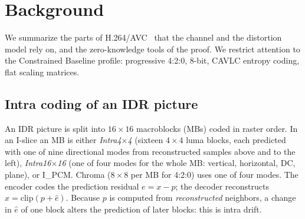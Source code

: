 \section{Background}
\label{sec:background}

We summarize the parts of H.264/AVC~\cite{itu_h264,wiegand2003overview,richardson2010h264} that the channel and the distortion model rely on, and the zero-knowledge tools of the proof. We restrict attention to the Constrained Baseline profile: progressive 4:2:0, 8-bit, CAVLC entropy coding, flat scaling matrices.

\subsection{Intra coding of an IDR picture}
An IDR picture is split into $16\times16$ macroblocks (MBs) coded in raster order. In an I-slice an MB is either \emph{Intra4$\times$4} (sixteen $4\times4$ luma blocks, each predicted with one of nine directional modes from reconstructed samples above and to the left), \emph{Intra16$\times$16} (one of four modes for the whole MB: vertical, horizontal, DC, plane), or I\_PCM. Chroma ($8\times8$ per MB for 4:2:0) uses one of four modes. The encoder codes the prediction residual $e=x-p$; the decoder reconstructs $\hat x=\mathrm{clip}(p+\hat e)$. Because $p$ is computed from \emph{reconstructed} neighbors, a change in $\hat e$ of one block alters the prediction of later blocks: this is intra drift.

